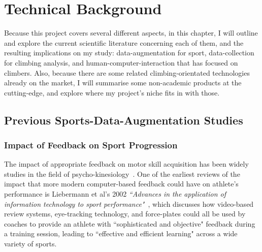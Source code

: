 \chapter{Technical Background}
\label{chap:technical}





\noindent
Because this project covers several different aspects, in this chapter, I will outline and explore the current scientific literature concerning each of them, and the resulting implications on my study: data-augmentation for sport, data-collection for climbing analysis, and human-computer-interaction that has focused on climbers.
Also, because there are some related climbing-orientated technologies already on the market, I will summarise some non-academic products at the cutting-edge, and explore where my project's niche fits in with those.


\section{Previous Sports-Data-Augmentation Studies}
\subsection{Impact of Feedback on Sport Progression}
The impact of appropriate feedback on motor skill acquisition has been widely studies in the field of psycho-kinesiology~\cite{schmidt75aschema, schmidt2005motor}.
One of the earliest reviews of the impact that more modern computer-based feedback could have on athlete's performance is Liebermann et al's 2002 \textit{``Advances in the application of information technology
to sport performance"}~\cite{lieberreview}, which discusses how video-based review systems, eye-tracking technology, and force-plates could all be used by coaches to provide an athlete with ``sophisticated and objective" feedback during a training session, leading to ``effective and efficient learning" across a wide variety of sports.

